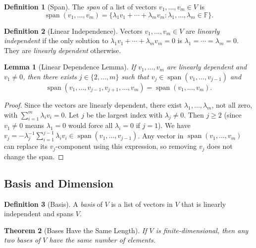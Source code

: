 \documentclass[11pt,a4paper]{article}
\theoremstyle{definition}
\newtheorem{definition}{Definition}[section]
\theoremstyle{plain}
\newtheorem{theorem}{Theorem}[section]
\newtheorem{lemma}[theorem]{Lemma}
\theoremstyle{remark}
\newcommand{\F}{\mathbb{F}}
\DeclareMathOperator{\Span}{span}
\begin{document}
\begin{definition}[Span]
\label{def:span}
The \emph{span} of a list of vectors $v_1, \ldots, v_m \in V$ is
\[
    \Span(v_1, \ldots, v_m) = \{\lambda_1 v_1 + \cdots + \lambda_m v_m : \lambda_1, \ldots, \lambda_m \in \F\}.
\]
\end{definition}

\begin{definition}[Linear Independence]
\label{def:linear_independence}
Vectors $v_1, \ldots, v_m \in V$ are \emph{linearly independent} if the only solution to
$\lambda_1 v_1 + \cdots + \lambda_m v_m = 0$ is $\lambda_1 = \cdots = \lambda_m = 0$.
They are \emph{linearly dependent} otherwise.
\end{definition}

\begin{lemma}[Linear Dependence Lemma]
\label{lem:lin_dep}
If $v_1, \ldots, v_m$ are linearly dependent and $v_1 \neq 0$, then there exists
$j \in \{2, \ldots, m\}$ such that $v_j \in \Span(v_1, \ldots, v_{j-1})$ and
\[
    \Span(v_1, \ldots, v_{j-1}, v_{j+1}, \ldots, v_m) = \Span(v_1, \ldots, v_m).
\]
\end{lemma}

\begin{proof}
Since the vectors are linearly dependent, there exist $\lambda_1, \ldots, \lambda_m$,
not all zero, with $\sum_{i=1}^m \lambda_i v_i = 0$. Let $j$ be the largest index with
$\lambda_j \neq 0$. Then $j \geq 2$ (since $v_1 \neq 0$ means $\lambda_1 = 0$ would
force all $\lambda_i = 0$ if $j = 1$). We have
$v_j = -\lambda_j^{-1} \sum_{i=1}^{j-1} \lambda_i v_i \in \Span(v_1, \ldots, v_{j-1})$.
Any vector in $\Span(v_1, \ldots, v_m)$ can replace its $v_j$-component using this
expression, so removing $v_j$ does not change the span.
\end{proof}

\subsection{Basis and Dimension}
\label{subsec:basis_dimension}

\begin{definition}[Basis]
\label{def:basis}
A \emph{basis} of $V$ is a list of vectors in $V$ that is linearly independent and spans $V$.
\end{definition}

\begin{theorem}[Bases Have the Same Length]
\label{thm:dimension}
If $V$ is finite-dimensional, then any two bases of $V$ have the same number of elements.
\end{theorem}
\end{document}

